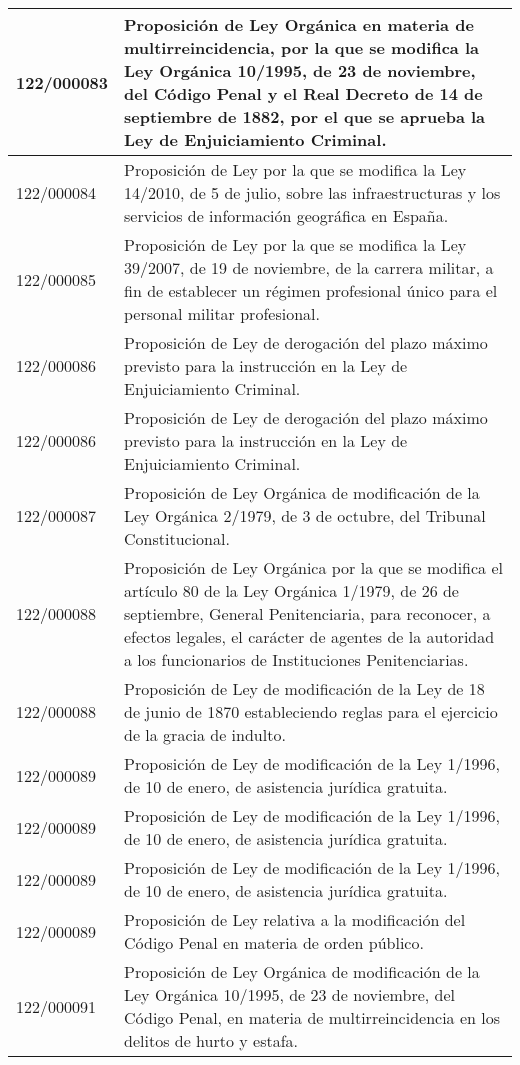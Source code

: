 {\begin{table}[H]
\begin{center}
\begin{tabularx}{\linewidth}{| l | X |}
\hline
122/000083 & Proposición de Ley Orgánica en materia de multirreincidencia, por la que se modifica la Ley Orgánica 10/1995, de 23 de noviembre, del Código Penal y el Real Decreto de 14 de septiembre de 1882, por el que se aprueba la Ley de Enjuiciamiento Criminal. \\
\hline
122/000084 & Proposición de Ley por la que se modifica la Ley 14/2010, de 5 de julio, sobre las infraestructuras y los servicios de información geográfica en España. \\
\hline
122/000085 & Proposición de Ley por la que se modifica la Ley 39/2007, de 19 de noviembre, de la carrera militar, a fin de establecer un régimen profesional único para el personal militar profesional. \\
\hline
122/000086 & Proposición de Ley de derogación del plazo máximo previsto para la instrucción en la Ley de Enjuiciamiento Criminal. \\
\hline
122/000086 & Proposición de Ley de derogación del plazo máximo previsto para la instrucción en la Ley de Enjuiciamiento Criminal. \\
\hline
122/000087 & Proposición de Ley Orgánica de modificación de la Ley Orgánica 2/1979, de 3 de octubre, del Tribunal Constitucional. \\
\hline
122/000088 & Proposición de Ley Orgánica por la que se modifica el artículo 80 de la Ley Orgánica 1/1979, de 26 de septiembre, General Penitenciaria, para reconocer, a efectos legales, el carácter de agentes de la autoridad a los funcionarios de Instituciones Penitenciarias. \\
\hline
122/000088 & Proposición de Ley de modificación de la Ley de 18 de junio de 1870 estableciendo reglas para el ejercicio de la gracia de indulto. \\
\hline
122/000089 & Proposición de Ley de modificación de la Ley 1/1996, de 10 de enero, de asistencia jurídica gratuita. \\
\hline
122/000089 & Proposición de Ley de modificación de la Ley 1/1996, de 10 de enero, de asistencia jurídica gratuita. \\
\hline
122/000089 & Proposición de Ley de modificación de la Ley 1/1996, de 10 de enero, de asistencia jurídica gratuita. \\
\hline
122/000089 & Proposición de Ley relativa a la modificación del Código Penal en materia de orden público. \\
\hline
122/000091 & Proposición de Ley Orgánica de modificación de la Ley Orgánica 10/1995, de 23 de noviembre, del Código Penal, en materia de multirreincidencia en los delitos de hurto y estafa. \\

\end{tabularx}
\end{center}
\end{table}}
